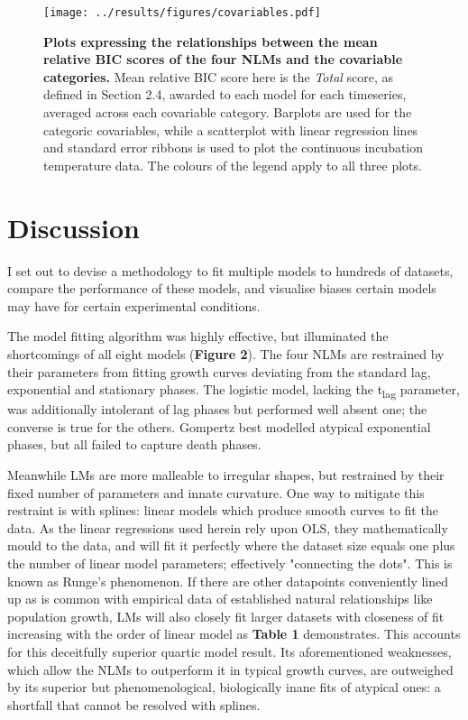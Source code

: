 \documentclass[11pt]{article}
\begin{document}
\begin{figure*}
    \centering
    \texttt{[image: ../results/figures/covariables.pdf]} %
    \caption{\textbf{Plots expressing the relationships between the mean relative BIC scores of the four NLMs and the covariable categories.}  Mean relative BIC score here is the \textit{Total} score, as defined in Section 2.4, awarded to each model for each timeseries, averaged across each covariable category. Barplots are used for the categoric covariables, while a scatterplot with linear regression lines and standard error ribbons is used to plot the continuous incubation temperature data. The colours of the legend apply to all three plots.}
\end{figure*}





\section{Discussion}%

I set out to devise a methodology to fit multiple models to hundreds of datasets, compare the performance of these models, and visualise biases certain models may have for certain experimental conditions.

The model fitting algorithm was highly effective, but illuminated the shortcomings of all eight models (\textbf{Figure 2}). The four NLMs are restrained by their parameters from fitting growth curves deviating from the standard lag, exponential and stationary phases. The logistic model, lacking the t\textsubscript{lag} parameter, was additionally intolerant of lag phases but performed well absent one; the converse is true for the others. Gompertz best modelled atypical exponential phases, but all failed to capture death phases.

Meanwhile LMs are more malleable to irregular shapes, but restrained by their fixed number of parameters and innate curvature. One way to mitigate this restraint is with splines: linear models which produce smooth curves to fit the data.\parencite{White2017} As the linear regressions used herein rely upon OLS, they mathematically mould to the data, and will fit it perfectly where the dataset size equals one plus the number of linear model parameters; effectively "connecting the dots". This is known as Runge's phenomenon.\parencite{White2017} If there are other datapoints conveniently lined up as is common with empirical data of established natural relationships like population growth, LMs will also closely fit larger datasets with closeness of fit increasing with the order of linear model as \textbf{Table 1} demonstrates. This accounts for this deceitfully superior quartic model result. Its aforementioned weaknesses, which allow the NLMs to outperform it in typical growth curves, are outweighed by its superior but phenomenological, biologically inane fits of atypical ones: a shortfall that cannot be resolved with splines.
\end{document}
